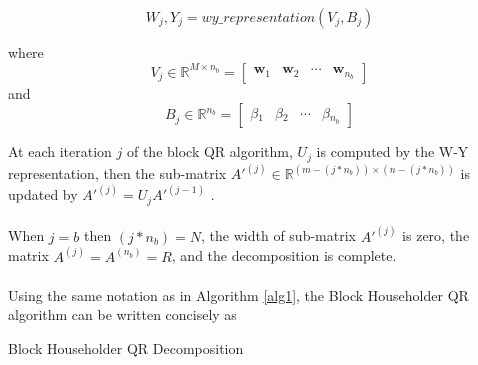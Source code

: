 \documentclass{article}
\begin{document}
\begin{equation}
W_j, Y_j = wy\_representation(V_j, B_j)
\end{equation}

where 
\begin{equation}
V_j \in \mathbb{R}^{M \times n_b} =
\begin{bmatrix}
\mathbf{w}_1 & \mathbf{w}_2 & \cdots & \mathbf{w}_{n_b}
\end{bmatrix}
\end{equation}
and
\begin{equation}
B_j \in \mathbb{R}^{n_b} = 
\begin{bmatrix}
\beta{}_1 & \beta{}_2 & \cdots & \beta{}_{n_b}
\end{bmatrix}
\end{equation}

At each iteration $j$ of the block QR algorithm, $U_j$ is computed by the W-Y representation, then the sub-matrix $A'^{(j)} \in \mathbb{R}^{(m - (j * n_b)) \times (n - (j * n_b))}$ is updated by $A'^{(j)} = U_{j}A'^{(j-1)}$ \cite{doi:10.1137/19M1296367} \cite{golub}.

\paragraph{}
When $j = b$ then $(j * n_b) = N$, the width of sub-matrix $A'^{(j)}$ is zero, the matrix $A^{(j)} = A^{(n_b)} = R$, and the decomposition is complete.

\paragraph{}
Using the same notation as in Algorithm \ref{alg1}, the Block Householder QR algorithm can be written concisely as
\begin{algorithm}
\label{blockqr}
\caption{Block Householder QR Decomposition}
\begin{algorithmic}

\ENDWHILE
\end{algorithmic}
\end{algorithm}



\end{document}
